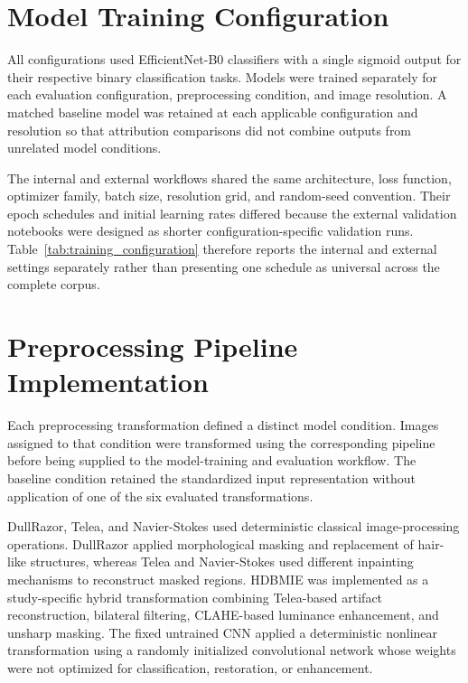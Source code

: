 
\section{Model Training Configuration}

All configurations used EfficientNet-B0 classifiers with a single sigmoid output for their respective binary classification tasks. Models were trained separately for each evaluation configuration, preprocessing condition, and image resolution. A matched baseline model was retained at each applicable configuration and resolution so that attribution comparisons did not combine outputs from unrelated model conditions.

The internal and external workflows shared the same architecture, loss function, optimizer family, batch size, resolution grid, and random-seed convention. Their epoch schedules and initial learning rates differed because the external validation notebooks were designed as shorter configuration-specific validation runs. Table~\ref{tab:training_configuration} therefore reports the internal and external settings separately rather than presenting one schedule as universal across the complete corpus.

% 

\section{Preprocessing Pipeline Implementation}

Each preprocessing transformation defined a distinct model condition. Images assigned to that condition were transformed using the corresponding pipeline before being supplied to the model-training and evaluation workflow. The baseline condition retained the standardized input representation without application of one of the six evaluated transformations.

DullRazor, Telea, and Navier-Stokes used deterministic classical image-processing operations. DullRazor applied morphological masking and replacement of hair-like structures, whereas Telea and Navier-Stokes used different inpainting mechanisms to reconstruct masked regions. HDBMIE was implemented as a study-specific hybrid transformation combining Telea-based artifact reconstruction, bilateral filtering, CLAHE-based luminance enhancement, and unsharp masking. The fixed untrained CNN applied a deterministic nonlinear transformation using a randomly initialized convolutional network whose weights were not optimized for classification, restoration, or enhancement.

